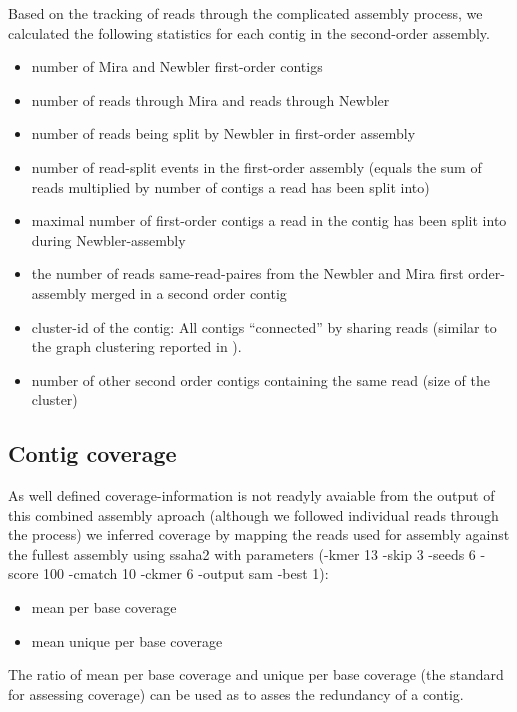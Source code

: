 \documentclass[12pt,a4paper]{article}
\begin{document}
Based on the tracking of reads through the complicated assembly
process, we calculated the following statistics for each contig in the
second-order assembly.

\begin{itemize}
\item number of Mira and Newbler first-order contigs
\item number of reads through Mira and reads through Newbler
\item number of reads being split by Newbler in first-order assembly
\item number of read-split events in the first-order assembly (equals
  the sum of reads multiplied by number of contigs a read has been
  split into)
\item maximal number of first-order contigs a read in the contig has
  been split into during Newbler-assembly
\item the number of reads same-read-paires from the Newbler and Mira
  first order-assembly merged in a second order contig
\item cluster-id of the contig: All contigs ``connected'' by sharing
  reads (similar to the graph clustering reported in
  \cite{pmid21138572}). 
\item number of other second order contigs containing the same read
  (size of the cluster)
\end{itemize}



\subsection{Contig coverage}



As well defined coverage-information is not readyly avaiable from the
output of this combined assembly aproach (although we followed
individual reads through the process) we inferred coverage by mapping
the reads used for assembly against the fullest assembly using ssaha2
\cite{pmid11591649} with parameters (-kmer 13 -skip 3 -seeds 6 -score
100 -cmatch 10 -ckmer 6 -output sam -best 1):

\begin{itemize}
\item mean per base coverage
\item mean unique per base coverage
\end{itemize}

The ratio of mean per base coverage and unique per base coverage (the
standard for assessing coverage) can be used as to asses the
redundancy of a contig.
\end{document}
